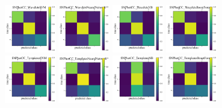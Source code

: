 \begin{figure}
	\begin{center}
		\includegraphics[width=0.2\textwidth]{./fig/SNPhotCC_WaveletsSVM_cm.png}
		\includegraphics[width=0.2\textwidth]{./fig/SNPhotCC_WaveletsNeuralNetwork_cm.png}
		\includegraphics[width=0.2\textwidth]{./fig/SNPhotCC_WaveletsNB_cm.png}
		\includegraphics[width=0.2\textwidth]{./fig/SNPhotCC_WaveletsBoostForest_cm.png}\\
		\includegraphics[width=0.2\textwidth]{./fig/SNPhotCC_TemplatesSVM_cm.png}
		\includegraphics[width=0.2\textwidth]{./fig/SNPhotCC_TemplatesNeuralNetwork_cm.png}
		\includegraphics[width=0.2\textwidth]{./fig/SNPhotCC_TemplatesNB_cm.png}
		\includegraphics[width=0.2\textwidth]{./fig/SNPhotCC_TemplatesBoostForest_cm.png}
		\caption{}
		\label{fig:snphotcc_cm}
	\end{center}
\end{figure}
